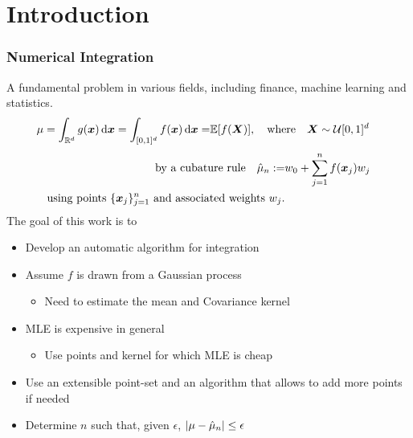 \documentclass[10pt,compress,xcolor={usenames,dvipsnames}]{beamer} %
\newcommand{\Ex}{\mathbb{E}}
\newcommand{\errtol}{{\epsilon}}
\def\abs#1{\ensuremath{\left \lvert #1 \right \rvert}}
\begin{document}
\section{Introduction}
\frame
{
\frametitle{Numerical Integration}
\vspace{-5ex}
A fundamental problem in various fields, including finance, machine learning and statistics.
\vspace{-2ex}
\begin{align*}
\mu = \int_{\reals^d} g(\vx) \,  \dif \vx = \int_{[0,1]^d} f(\vx) \,
\dif\vx  = & \Ex[f(\vX)], \quad \text{where} \quad \vX \sim \cu [0,1]^d
\end{align*}
\vspace{-5ex}
\begin{align*}
\text{by a  cubature rule} \quad
\hat{\mu}_n := & w_0 + \sum_{j=1}^{n} f(\boldsymbol{x}_j) w_j \qquad
\\
\qquad \text{using  points $\{\boldsymbol{x}_j \}_{j=1}^{n}$ and associated weights $w_j$.}
\end{align*}
\pause
The goal of this work is to
\vspace{-3ex}
\begin{itemize}
\item Develop an automatic algorithm for integration
\item Assume \alert{$f$} is drawn from a Gaussian process
\begin{itemize}
\item Need to estimate the mean and Covariance kernel
\end{itemize}
\item MLE is expensive in general
\begin{itemize}
\item Use points and kernel for which MLE is cheap
\end{itemize}
\item Use an \alert{extensible} point-set and an algorithm that allows to add more points if needed
\item Determine \alert{$n$} such that, given \alert{$\errtol$}, $\abs{\mu-\hmu_n} \leq \errtol$
\end{itemize}
}
\end{document}
